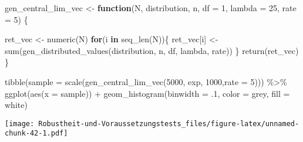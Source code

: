 \documentclass[
]{book}
\newenvironment{Shaded}{\begin{snugshade}}{\end{snugshade}}
\newcommand{\AttributeTok}[1]{\textcolor[rgb]{0.77,0.63,0.00}{#1}}
\newcommand{\ControlFlowTok}[1]{\textcolor[rgb]{0.13,0.29,0.53}{\textbf{#1}}}
\newcommand{\DecValTok}[1]{\textcolor[rgb]{0.00,0.00,0.81}{#1}}
\newcommand{\FunctionTok}[1]{\textcolor[rgb]{0.00,0.00,0.00}{#1}}
\newcommand{\NormalTok}[1]{#1}
\newcommand{\OtherTok}[1]{\textcolor[rgb]{0.56,0.35,0.01}{#1}}
\newcommand{\SpecialCharTok}[1]{\textcolor[rgb]{0.00,0.00,0.00}{#1}}
\newcommand{\StringTok}[1]{\textcolor[rgb]{0.31,0.60,0.02}{#1}}
\begin{document}
\begin{Shaded}
\begin{Highlighting}[]
\NormalTok{gen\_central\_lim\_vec }\OtherTok{\textless{}{-}} \ControlFlowTok{function}\NormalTok{(N, }
\NormalTok{                                distribution,}
\NormalTok{                                n,}
                                \AttributeTok{df =} \DecValTok{1}\NormalTok{,}
                                \AttributeTok{lambda =} \DecValTok{25}\NormalTok{,}
                                \AttributeTok{rate =} \DecValTok{5}\NormalTok{) \{}
  
\NormalTok{  ret\_vec }\OtherTok{\textless{}{-}} \FunctionTok{numeric}\NormalTok{(N)}
  \ControlFlowTok{for}\NormalTok{(i }\ControlFlowTok{in} \FunctionTok{seq\_len}\NormalTok{(N))\{}
\NormalTok{    ret\_vec[i] }\OtherTok{\textless{}{-}} \FunctionTok{sum}\NormalTok{(}\FunctionTok{gen\_distributed\_values}\NormalTok{(distribution,}
\NormalTok{                                      n,}
\NormalTok{                                      df,}
\NormalTok{                                      lambda,}
\NormalTok{                                      rate))}
\NormalTok{  \}}
  \FunctionTok{return}\NormalTok{(ret\_vec)}
\NormalTok{\}}

\FunctionTok{tibble}\NormalTok{(}\AttributeTok{sample =} \FunctionTok{scale}\NormalTok{(}\FunctionTok{gen\_central\_lim\_vec}\NormalTok{(}\DecValTok{5000}\NormalTok{, }\StringTok{\textquotesingle{}exp\textquotesingle{}}\NormalTok{, }\DecValTok{1000}\NormalTok{,}\AttributeTok{rate =} \DecValTok{5}\NormalTok{))) }\SpecialCharTok{\%\textgreater{}\%} 
  \FunctionTok{ggplot}\NormalTok{(}\FunctionTok{aes}\NormalTok{(}\AttributeTok{x =}\NormalTok{ sample)) }\SpecialCharTok{+}
  \FunctionTok{geom\_histogram}\NormalTok{(}\AttributeTok{binwidth =}\NormalTok{ .}\DecValTok{1}\NormalTok{,}
                 \AttributeTok{color =} \StringTok{\textquotesingle{}grey\textquotesingle{}}\NormalTok{,}
                 \AttributeTok{fill =} \StringTok{\textquotesingle{}white\textquotesingle{}}\NormalTok{)}
\end{Highlighting}
\end{Shaded}

\texttt{[image: Robustheit-und-Voraussetzungstests\_files/figure-latex/unnamed-chunk-42-1.pdf]}

  
\end{document}
